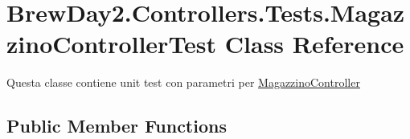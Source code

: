 \hypertarget{class_brew_day2_1_1_controllers_1_1_tests_1_1_magazzino_controller_test}{}\section{Brew\+Day2.\+Controllers.\+Tests.\+Magazzino\+Controller\+Test Class Reference}
\label{class_brew_day2_1_1_controllers_1_1_tests_1_1_magazzino_controller_test}


Questa classe contiene unit test con parametri per \mbox{\hyperlink{class_brew_day2_1_1_controllers_1_1_magazzino_controller}{Magazzino\+Controller}} 


\subsection*{Public Member Functions}
